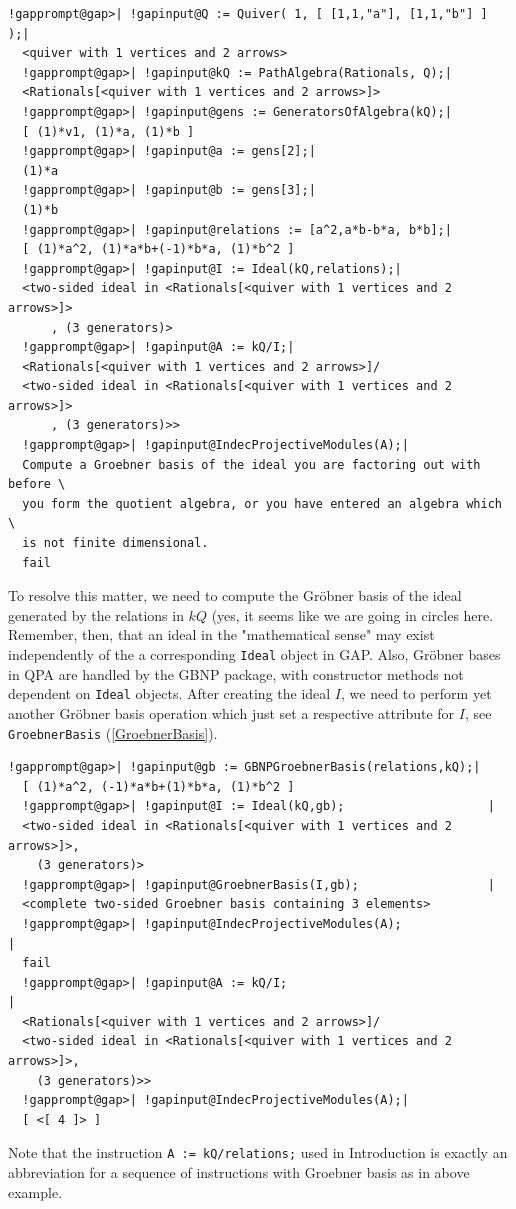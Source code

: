 \documentclass[a4paper,11pt]{report}
\begin{document}
{{ 
\begin{Verbatim}[commandchars=!@|,fontsize=\small,frame=single,label=Example]
  !gapprompt@gap>| !gapinput@Q := Quiver( 1, [ [1,1,"a"], [1,1,"b"] ] );|
  <quiver with 1 vertices and 2 arrows>
  !gapprompt@gap>| !gapinput@kQ := PathAlgebra(Rationals, Q);|
  <Rationals[<quiver with 1 vertices and 2 arrows>]>
  !gapprompt@gap>| !gapinput@gens := GeneratorsOfAlgebra(kQ);|
  [ (1)*v1, (1)*a, (1)*b ]
  !gapprompt@gap>| !gapinput@a := gens[2];|
  (1)*a
  !gapprompt@gap>| !gapinput@b := gens[3];|
  (1)*b
  !gapprompt@gap>| !gapinput@relations := [a^2,a*b-b*a, b*b];|
  [ (1)*a^2, (1)*a*b+(-1)*b*a, (1)*b^2 ]
  !gapprompt@gap>| !gapinput@I := Ideal(kQ,relations);|
  <two-sided ideal in <Rationals[<quiver with 1 vertices and 2 arrows>]>
      , (3 generators)>
  !gapprompt@gap>| !gapinput@A := kQ/I;|
  <Rationals[<quiver with 1 vertices and 2 arrows>]/
  <two-sided ideal in <Rationals[<quiver with 1 vertices and 2 arrows>]>
      , (3 generators)>>
  !gapprompt@gap>| !gapinput@IndecProjectiveModules(A);|
  Compute a Groebner basis of the ideal you are factoring out with before \
  you form the quotient algebra, or you have entered an algebra which \
  is not finite dimensional.
  fail
\end{Verbatim}
 To resolve this matter, we need to compute the Gr{\"o}bner basis of the ideal
generated by the relations in $kQ$ (yes, it seems like we are going in circles here. Remember, then, that an
ideal in the "mathematical sense" may exist independently of the a
corresponding \texttt{Ideal} object in \textsf{GAP}. Also, Gr{\"o}bner bases in \textsf{QPA} are handled by the \textsf{GBNP} package, with constructor methods not dependent on \texttt{Ideal} objects. After creating the ideal $I$, we need to perform yet another Gr{\"o}bner basis operation which just set a
respective attribute for $I$, see \texttt{GroebnerBasis} (\ref{GroebnerBasis}). 
\begin{Verbatim}[commandchars=!@|,fontsize=\small,frame=single,label=Example]
  !gapprompt@gap>| !gapinput@gb := GBNPGroebnerBasis(relations,kQ);|
  [ (1)*a^2, (-1)*a*b+(1)*b*a, (1)*b^2 ]
  !gapprompt@gap>| !gapinput@I := Ideal(kQ,gb);                    |
  <two-sided ideal in <Rationals[<quiver with 1 vertices and 2 arrows>]>, 
    (3 generators)>
  !gapprompt@gap>| !gapinput@GroebnerBasis(I,gb);                  |
  <complete two-sided Groebner basis containing 3 elements>
  !gapprompt@gap>| !gapinput@IndecProjectiveModules(A);                                                |
  fail
  !gapprompt@gap>| !gapinput@A := kQ/I;                                                                |
  <Rationals[<quiver with 1 vertices and 2 arrows>]/
  <two-sided ideal in <Rationals[<quiver with 1 vertices and 2 arrows>]>, 
    (3 generators)>>
  !gapprompt@gap>| !gapinput@IndecProjectiveModules(A);|
  [ <[ 4 ]> ]
\end{Verbatim}
 Note that the instruction \texttt{A := kQ/relations;} used in Introduction is exactly an abbreviation for a sequence of instructions
with Groebner basis as in above example.

}}
\end{document}
